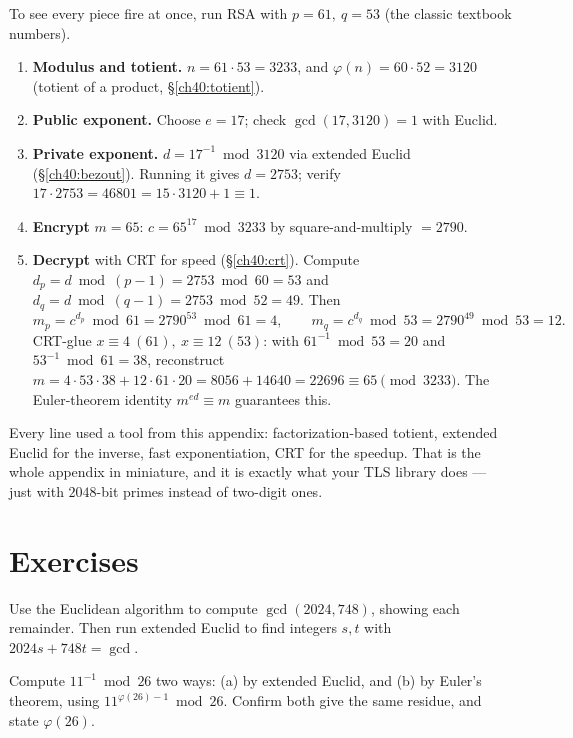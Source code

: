 To see every piece fire at once, run RSA with $p=61,\ q=53$ (the classic textbook numbers).

\begin{enumerate}
\item \textbf{Modulus and totient.} $n = 61\cdot 53 = 3233$, and $\varphi(n) = 60\cdot 52 = 3120$
      (totient of a product, \S\ref{ch40:totient}).
\item \textbf{Public exponent.} Choose $e = 17$; check $\gcd(17,3120)=1$ with Euclid.
\item \textbf{Private exponent.} $d = 17^{-1}\bmod 3120$ via extended Euclid (\S\ref{ch40:bezout}).
      Running it gives $d = 2753$; verify $17\cdot 2753 = 46801 = 15\cdot 3120 + 1\equiv 1$.
\item \textbf{Encrypt} $m = 65$: $c = 65^{17}\bmod 3233$ by square-and-multiply $= 2790$.
\item \textbf{Decrypt} with CRT for speed (\S\ref{ch40:crt}). Compute
      $d_p = d\bmod (p-1) = 2753\bmod 60 = 53$ and $d_q = d\bmod(q-1) = 2753\bmod 52 = 49$. Then
      \[
        m_p = c^{d_p}\bmod 61 = 2790^{53}\bmod 61 = 4,\qquad
        m_q = c^{d_q}\bmod 53 = 2790^{49}\bmod 53 = 12.
      \]
      CRT-glue $x\equiv 4\ (61),\ x\equiv 12\ (53)$: with $61^{-1}\bmod 53 = 20$ and $53^{-1}\bmod
      61 = 38$, reconstruct $m = 4\cdot 53\cdot 38 + 12\cdot 61\cdot 20 = 8056 + 14640 = 22696
      \equiv 65 \pmod{3233}$. The Euler-theorem identity $m^{ed}\equiv m$ guarantees this.
\end{enumerate}

Every line used a tool from this appendix: factorization-based totient, extended Euclid for the
inverse, fast exponentiation, CRT for the speedup. That is the whole appendix in miniature, and it is
exactly what your TLS library does --- just with $2048$-bit primes instead of two-digit ones.

\section{Exercises}
\label{ch40:exercises}

\begin{exercise}
\label{ch40:ex-gcd}
Use the Euclidean algorithm to compute $\gcd(2024, 748)$, showing each remainder. Then run extended
Euclid to find integers $s,t$ with $2024s + 748t = \gcd$.
\end{exercise}

\begin{exercise}
\label{ch40:ex-inverse}
Compute $11^{-1}\bmod 26$ two ways: (a) by extended Euclid, and (b) by Euler's theorem, using
$11^{\varphi(26)-1}\bmod 26$. Confirm both give the same residue, and state $\varphi(26)$.
\end{exercise}

